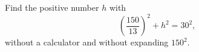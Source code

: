 Find the positive number $h$ with
\[
\left(\dfrac{150}{13}\right)^2+h^2=30^2,
\]
without a calculator and without expanding $150^2$.
